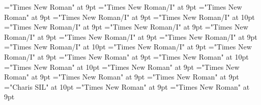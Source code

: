 \documentclass[gps1,twoside]{article}
\begin{document}
\font\sensespanspandiventryletData="Times New Roman" at 9pt
\font\morphosyntaxanalysissensesensesentrysensespanspandiventryletData="Times New Roman/I" at 9pt
\font\morphosyntaxanalysissensesensesentryaftersensespanspandiventryletData="Times New Roman" at 9pt
\font\partofspeechmorphosyntaxanalysissensesensesentrysensespanspandiventryletData="Times New Roman/I" at 9pt
\font\spanenpartofspeechmorphosyntaxanalysissensesensesentrysensespanspandiventryletData="Times New Roman/I" at 10pt
\font\spanpartofspeechmorphosyntaxanalysissensesensessubentrysubentriesentrylastchildafterpartofspeechmorphosyntaxanalysissensesensesentrysensespanspandiventryletData="Times New Roman/I" at 9pt
\font\spanmorphosyntaxanalysissensesensesentrysensespanspandiventryletData="Times New Roman/I" at 9pt
\font\slotsmorphosyntaxanalysissensesensesentrybeforemorphosyntaxanalysissensesensesentrysensespanspandiventryletData="Times New Roman/I" at 9pt
\font\slotspanmorphosyntaxanalysissensesensesentrysensespanspandiventryletData="Times New Roman/I" at 9pt
\font\spanslotspanmorphosyntaxanalysissensesensesentrysensespanspandiventryletData="Times New Roman/I" at 9pt
\font\spanenspanslotspanmorphosyntaxanalysissensesensesentrysensespanspandiventryletData="Times New Roman/I" at 10pt
\font\spannameacademicdomainacademicdomainssensesensessensesensessubentrysubentriesentryfirstchildbeforespanslotspanmorphosyntaxanalysissensesensesentrysensespanspandiventryletData="Times New Roman/I" at 9pt
\font\spannameacademicdomainacademicdomainssensesensessensesensessubentrysubentriesentrylastchildafterspanslotspanmorphosyntaxanalysissensesensesentrysensespanspandiventryletData="Times New Roman/I" at 9pt
\font\spansensespanspandiventryletData="Times New Roman" at 9pt
\font\spanenspansensespanspandiventryletData="Times New Roman" at 10pt
\font\spandefinitionorglossreferencedentryreferencedentriescomplexformentryrefcomplexformentryrefsminorentryvariantfirstchildbeforespansensespanspandiventryletData="Times New Roman" at 10pt
\font\spandefinitionorglosssensesensessensesensessubentrysubentriesentrylastchildafterspansensespanspandiventryletData="Times New Roman" at 9pt
\font\pronunciationsentryafterdiventryletData="Times New Roman" at 9pt
\font\pronunciationspandiventryletData="Times New Roman" at 9pt
\font\spanpronunciationspandiventryletData="Times New Roman" at 9pt
\font\spanbzhfonipaspanpronunciationspandiventryletData="Charis SIL" at 10pt
\font\spanformpronunciationpronunciationssubentrysubentriesentryfirstchildbeforespanpronunciationspandiventryletData="Times New Roman" at 9pt
\font\spanformpronunciationpronunciationssubentrysubentriesentrylastchildafterspanpronunciationspandiventryletData="Times New Roman" at 9pt
\end{document}
